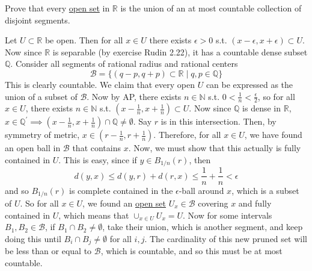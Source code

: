   \begin{exercise}[Rudin 2.27]

  \end{exercise}
  \begin{solution}
    
  \end{solution}

  \begin{exercise}[Rudin 2.28]

  \end{exercise}
  \begin{solution}
    
  \end{solution}

  \begin{exercise}[Rudin 2.29]
    Prove that every \hyperref[pst-def:open-set]{open set} in $\mathbb{R}$ is the union of an at most countable collection of disjoint segments. 
  \end{exercise}
  \begin{solution}
    Let $U \subset \mathbb{R}$ be open. Then for all $x \in U$ there exists $\epsilon > 0$ s.t. $(x - \epsilon, x + \epsilon) \subset U$. Now since $\mathbb{R}$ is separable (by exercise Rudin 2.22), it has a countable dense subset $\mathbb{Q}$. Consider all segments of rational radius and rational centers 
    \begin{equation}
      \mathscr{B} = \{ (q - p, q + p) \subset \mathbb{R} \mid q, p \in \mathbb{Q}\}
    \end{equation}
    This is clearly countable. We claim that every open $U$ can be expressed as the union of a subset of $\mathscr{B}$. Now by AP, there exists $n \in \mathbb{N}$ s.t. $0 < \frac{1}{n} < \frac{\epsilon}{2}$, so for all $x \in U$, there exists $n \in \mathbb{N}$ s.t. $(x - \frac{1}{n}, x + \frac{1}{n}) \subset U$. Now since $\mathbb{Q}$ is dense in $\mathbb{R}$, $x \in \mathbb{Q}^\prime \implies (x - \frac{1}{n}, x + \frac{1}{n}) \cap \mathbb{Q} \neq \emptyset$. Say $r$ is in this intersection. Then, by symmetry of metric, $x \in (r - \frac{1}{n}, r + \frac{1}{n})$. Therefore, for all $x \in U$, we have found an open ball in $\mathscr{B}$ that contains $x$. Now, we must show that this actually is fully contained in $U$. This is easy, since if $y \in B_{1/n} (r)$, then 
    \begin{equation}
      d(y, x) \leq d(y, r) + d(r, x) \leq \frac{1}{n} + \frac{1}{n} < \epsilon
    \end{equation}
    and so $B_{1/n} (r)$ is complete contained in the $\epsilon$-ball around $x$, which is a subset of $U$. So for all $x \in U$, we found an \hyperref[pst-def:open-set]{open set} $U_x \in \mathscr{B}$ covering $x$ and fully contained in $U$, which means that $\cup_{x \in U} U_x = U$. Now for some intervals $B_1, B_2 \in \mathscr{B}$, if $B_1 \cap B_2 \neq \emptyset$, take their union, which is another segment, and keep doing this until $B_i \cap B_j \neq \emptyset$ for all $i, j$. The cardinality of this new pruned set will be less than or equal to $\mathscr{B}$, which is countable, and so this must be at most countable. 
  \end{solution}

